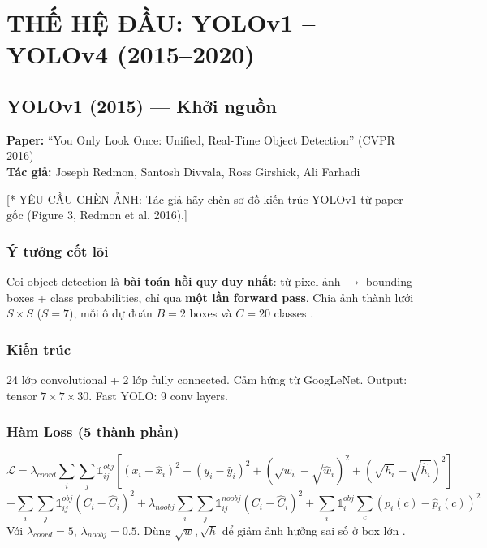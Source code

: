 \chapter{THẾ HỆ ĐẦU: YOLOv1 -- YOLOv4 (2015--2020)}

\section{YOLOv1 (2015) --- Khởi nguồn}
\textbf{Paper:} ``You Only Look Once: Unified, Real-Time Object Detection'' (CVPR 2016) \cite{yolov1}\\
\textbf{Tác giả:} Joseph Redmon, Santosh Divvala, Ross Girshick, Ali Farhadi

[* YÊU CẦU CHÈN ẢNH: Tác giả hãy chèn sơ đồ kiến trúc YOLOv1 từ paper gốc (Figure 3, Redmon et al. 2016).]

\subsection{Ý tưởng cốt lõi}
Coi object detection là \textbf{bài toán hồi quy duy nhất}: từ pixel ảnh $\rightarrow$ bounding boxes + class probabilities, chỉ qua \textbf{một lần forward pass}. Chia ảnh thành lưới $S \times S$ ($S=7$), mỗi ô dự đoán $B=2$ boxes và $C=20$ classes \cite{yolov1}.

\subsection{Kiến trúc}
24 lớp convolutional + 2 lớp fully connected. Cảm hứng từ GoogLeNet. Output: tensor $7 \times 7 \times 30$. Fast YOLO: 9 conv layers.

\subsection{Hàm Loss (5 thành phần)}
\begin{equation}
\mathcal{L} = \lambda_{coord}\sum_{i}\sum_{j}\mathbb{1}_{ij}^{obj}\left[(x_i-\hat{x}_i)^2+(y_i-\hat{y}_i)^2+(\sqrt{w_i}-\sqrt{\hat{w}_i})^2+(\sqrt{h_i}-\sqrt{\hat{h}_i})^2\right]
\end{equation}
\begin{equation}
+ \sum_{i}\sum_{j}\mathbb{1}_{ij}^{obj}(C_i-\hat{C}_i)^2 + \lambda_{noobj}\sum_{i}\sum_{j}\mathbb{1}_{ij}^{noobj}(C_i-\hat{C}_i)^2 + \sum_{i}\mathbb{1}_{i}^{obj}\sum_{c}(p_i(c)-\hat{p}_i(c))^2
\end{equation}
Với $\lambda_{coord}=5$, $\lambda_{noobj}=0.5$. Dùng $\sqrt{w}, \sqrt{h}$ để giảm ảnh hưởng sai số ở box lớn \cite{yolov1}.

